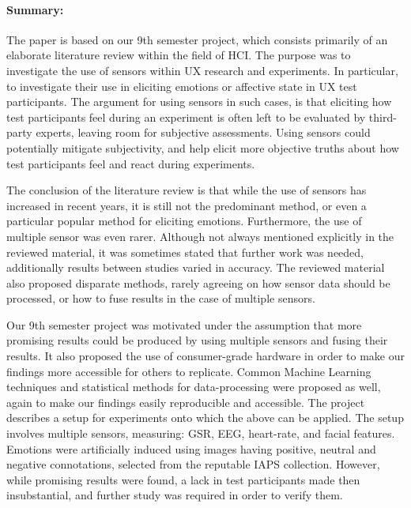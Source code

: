 \paragraph{Summary:}

The paper is based on our 9th semester project, which consists primarily of an
elaborate literature review within the field of HCI. The purpose was to
investigate the use of sensors within UX research and experiments. In
particular, to investigate their use in eliciting emotions or affective state in
UX test participants. The argument for using sensors in such cases, is that
eliciting how test participants feel during an experiment is often left to be
evaluated by third-party experts, leaving room for subjective assessments. Using
sensors could potentially mitigate subjectivity, and help elicit more objective
truths about how test participants feel and react during experiments.

The conclusion of the literature review is that while the use of sensors has increased in recent years,
it is still not the predominant method, or even a particular popular method for
eliciting emotions. Furthermore, the use of multiple sensor was even
rarer. Although not always mentioned explicitly in the reviewed material, it was
sometimes stated that further work was needed, additionally results between studies varied
in accuracy. The reviewed material also proposed disparate methods, rarely
agreeing on how sensor data should be processed, or how to fuse results in the case of
multiple sensors.

Our 9th semester project was motivated under the assumption that more promising
results could be produced by using multiple sensors and fusing their results. It
also proposed the use of consumer-grade hardware in order to make our findings
more accessible for others to replicate. Common Machine Learning techniques and statistical methods for
data-processing were proposed as well, again to make our findings easily
reproducible and accessible. The project describes a setup for experiments onto
which the above can be applied. The setup involves multiple sensors, measuring: GSR,
EEG, heart-rate, and facial features. Emotions were artificially induced using
images having positive, neutral and negative connotations, selected from the
reputable IAPS collection. However, while promising results were found, a lack
in test participants made then insubstantial, and further study was
required in order to verify them.

